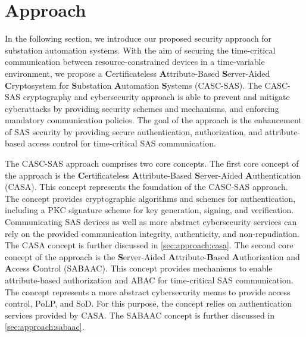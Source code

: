 \chapter{Approach}
\label{ch:approach}
In the following section, we introduce our proposed security approach for substation automation systems.
With the aim of securing the time-critical communication between resource-constrained devices in a time-variable environment, we propose a \textbf{C}ertificateless \textbf{A}ttribute-Based \textbf{S}erver-Aided \textbf{C}ryptosystem for \textbf{S}ubstation \textbf{A}utomation \textbf{S}ystems (CASC-SAS).
The CASC-SAS cryptography and cybersecurity approach is able to prevent and mitigate cyberattacks by providing security schemes and mechanisms, and enforcing mandatory communication policies.
The goal of the approach is the enhancement of SAS security by providing secure authentication, authorization, and attribute-based access control for time-critical SAS communication.

The CASC-SAS approach comprises two core concepts.
The first core concept of the approach is the \textbf{C}ertificateless \textbf{A}ttribute-Based \textbf{S}erver-Aided \textbf{A}uthentication (CASA).
This concept represents the foundation of the CASC-SAS approach.
The concept provides cryptographic algorithms and schemes for authentication, including a PKC signature scheme for key generation, signing, and verification.
Communicating SAS devices as well as more abstract cybersecurity services can rely on the provided communication integrity, authenticity, and non-repudiation.
The CASA concept is further discussed in \autoref{sec:approach:casa}.
The second core concept of the approach is the \textbf{S}erver-Aided \textbf{A}ttribute-\textbf{B}ased \textbf{A}uthorization and \textbf{A}ccess \textbf{C}ontrol (SABAAC).
This concept provides mechanisms to enable attribute-based authorization and ABAC for time-critical SAS communication.
The concept represents a more abstract cybersecurity means to provide access control, PoLP, and SoD.
For this purpose, the concept relies on authentication services provided by CASA.
The SABAAC concept is further discussed in \autoref{sec:approach:sabaac}.

